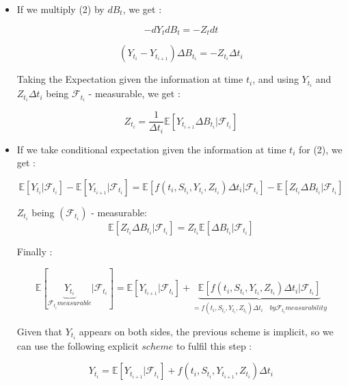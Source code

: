 \documentclass[english,11pt,openany]{article}
\theoremstyle{definition}
\theoremstyle{plain}
\theoremstyle{definition}
\begin{document}
	\begin{itemize}
		\item 
		If we multiply (2) by $dB_t$, we get : 
		
		\begin{displaymath}
		- dY_tdB_t = - Z_tdt 
		\end{displaymath}
		
		
		\begin{displaymath}
		(Y_{t_i} - Y_{t_{i + 1}}) \Delta B_{t_i} =- Z_{t_i}\Delta t_i
		\end{displaymath}
		
		Taking the Expectation given the information at time $t_i$, and using  
		$Y_{t_i}$ and $Z_{t_i}\Delta t_i$ being $\mathcal{F}_{t_i}$ - measurable, 
		we get : 
		
		\begin{displaymath}
		Z_{t_i} = \frac{1}{\Delta t_i}\mathbb{E}[Y_{t_{i + 1}} \Delta B_{t_i}  | \mathcal{F}_{t_i}]
		\end{displaymath}
		
		
		\item 
		
		If we take conditional expectation given the information at time $t_i$ for (2), we get : 
		
		\begin{displaymath}
		\mathbb{E}[Y_{t_i}| \mathcal{F}_{t_i}] - \mathbb{E}[Y_{t_{i + 1}} | \mathcal{F}_{t_i}] = \mathbb{E}[f(t_i,S_{t_i}, Y_{t_i}, Z_{t_i})\Delta t_i| \mathcal{F}_{t_i}] -\mathbb{E}[Z_{t_i}\Delta B_{t_i}| \mathcal{F}_{t_i}]
		\end{displaymath}
		
		$Z_{t_i}$ being $(\mathcal{F}_{t_i})$ - measurable: 
		\begin{displaymath}
		\mathbb{E}[Z_{t_i}\Delta B_{t_i}| \mathcal{F}_{t_i}] = Z_{t_i}\mathbb{E}[\Delta B_{t_i}| \mathcal{F}_{t_i}]
		\end{displaymath}
		
		Finally : 
		
		\begin{displaymath}
		\mathbb{E}[\underbrace{Y_{t_i}}_{\mathcal{F}_{t_i} measurable}| \mathcal{F}_{t_i}] = \mathbb{E}[Y_{t_{i + 1}} | \mathcal{F}_{t_i}] +  \underbrace{\mathbb{E}[f(t_i,S_{t_i}, Y_{t_i}, Z_{t_i})\Delta t_i| \mathcal{F}_{t_i}]}_{= f(t_i,S_{t_i}, Y_{t_i}, Z_{t_i})\Delta t_i \quad by \mathcal{F}_{t_i} measurability}
		\end{displaymath}
		
		Given that $Y_{t_i}$ appears on both sides, the previous scheme is implicit, so we can use the following explicit $scheme$ to fulfil this step : 
		
		\begin{displaymath}
		Y_{t_i} = \mathbb{E}[Y_{t_{i + 1}} | \mathcal{F}_{t_i}] +  f(t_i,S_{t_i}, Y_{t_{i + 1}}, Z_{t_i})\Delta t_i
		\end{displaymath}
		
	\end{itemize}
	
\end{document}

